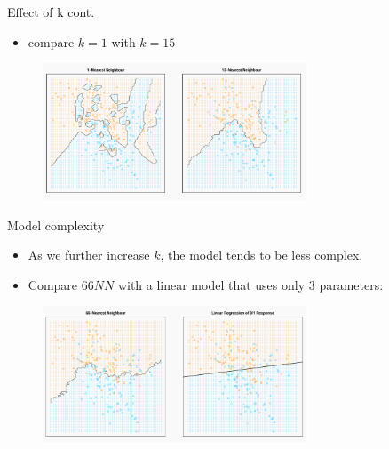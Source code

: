 \documentclass[serif, aspectratio=169]{beamer}
\begin{document}
\begin{frame}{Effect of k cont.}
    \begin{itemize}
        \item compare $k=1$ with $k=15$
    \end{itemize}
    \begin{figure}[h]
            \centering
            
            \includegraphics[width=0.7\textwidth]{pic/1vs15.png}
            \end{figure}
    
\end{frame}
\begin{frame}{Model complexity}
    \begin{itemize}
        \item As we further increase $k$, the model tends to be less complex.
        \item Compare $66NN$ with a linear model that uses only $3$ parameters:
    \end{itemize}
    
    \begin{figure}[h]
            \centering
            
            \includegraphics[width=0.7\textwidth]{pic/66vsLin.png}
            \end{figure}
\end{frame}
\end{document}
